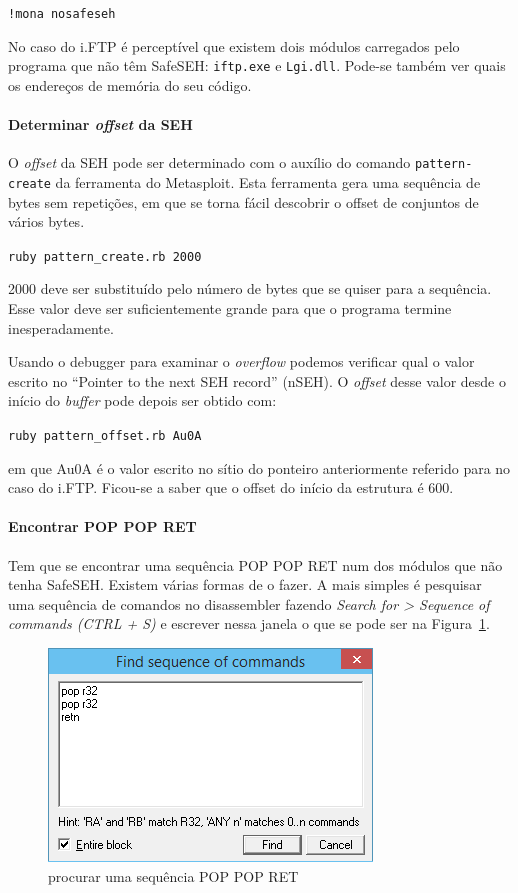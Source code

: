 \documentclass[a4paper]{article}
\begin{document}
	\texttt{!mona nosafeseh}

No caso do i.FTP é perceptível que existem dois módulos carregados pelo programa que não têm SafeSEH: \texttt{iftp.exe} e \texttt{Lgi.dll}. Pode-se também ver quais os endereços de memória do seu código.

\paragraph*{Determinar \textit{offset} da SEH} O \textit{offset} da SEH pode ser determinado com o auxílio do comando \texttt{pattern-create} da ferramenta do Metasploit. Esta ferramenta gera uma sequência de bytes sem repetições, em que se torna fácil descobrir o offset de conjuntos de vários bytes.

	\texttt{ruby pattern\_create.rb 2000}

2000 deve ser substituído pelo número de bytes que se quiser para a sequência. Esse valor deve ser suficientemente grande para que o programa termine inesperadamente.

Usando o debugger para examinar o \textit{overflow} podemos verificar qual o valor escrito no ``Pointer to the next SEH record'' (nSEH). O \textit{offset} desse valor desde o início do \textit{buffer} pode depois ser obtido com:

	\texttt{ruby pattern\_offset.rb Au0A}

em que Au0A é o valor escrito no sítio do ponteiro anteriormente referido para no caso do i.FTP. Ficou-se a saber que o offset do início da estrutura é 600.

\paragraph*{Encontrar POP POP RET} Tem que se encontrar uma sequência POP POP RET num dos módulos que não tenha SafeSEH. Existem várias formas de o fazer. A mais simples é pesquisar uma sequência de comandos no disassembler fazendo \textit{Search for > Sequence of commands (CTRL + S)} e escrever nessa janela o que se pode ser na Figura~\ref{find_POPPOPRET}.

\begin{figure}
	\centering
	\includegraphics[scale=1]{find_POPPOPRET}
	\caption{procurar uma sequência POP POP RET}
	\label{find_POPPOPRET}
\end{figure}
\end{document}

